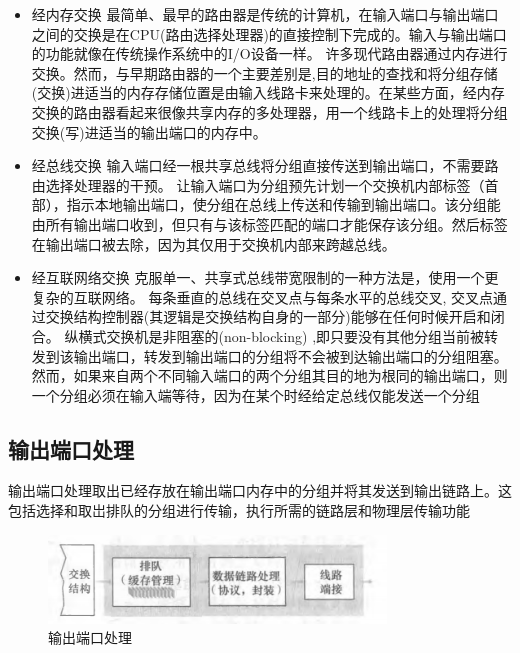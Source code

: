 \begin{itemize}
    \item 经内存交换
    \subitem 最简单、最早的路由器是传统的计算机，在输入端口与输出端口之间的交换是在CPU(路由选择处理器)的直接控制下完成的。输入与输出端口的功能就像在传统操作系统中的I/O设备一样。
    \subitem 许多现代路由器通过内存进行交换。然而，与早期路由器的一个主要差别是,目的地址的查找和将分组存储(交换)进适当的内存存储位置是由输入线路卡来处理的。在某些方面，经内存交换的路由器看起来很像共享内存的多处理器，用一个线路卡上的处理将分组交换(写)进适当的输出端口的内存中。
    \item 经总线交换
    \subitem 输入端口经一根共享总线将分组直接传送到输出端口，不需要路由选择处理器的干预。
    \subitem 让输入端口为分组预先计划一个交换机内部标签（首部），指示本地输出端口，使分组在总线上传送和传输到输出端口。该分组能由所有输出端口收到，但只有与该标签匹配的端口才能保存该分组。然后标签在输出端口被去除，因为其仅用于交换机内部来跨越总线。
    \item 经互联网络交换
    \subitem 克服单一、共享式总线带宽限制的一种方法是，使用一个更复杂的互联网络。
    \subitem 每条垂直的总线在交叉点与每条水平的总线交叉, 交叉点通过交换结构控制器(其逻辑是交换结构自身的一部分)能够在任何时候开启和闭合。
    \subitem 纵横式交换机是非阻塞的(non-blocking) ,即只要没有其他分组当前被转发到该输出端口，转发到输出端口的分组将不会被到达输出端口的分组阻塞。然而，如果来自两个不同输入端口的两个分组其目的地为根同的输出端口，则一个分组必须在输入端等待，因为在某个时经给定总线仅能发送一个分组
\end{itemize}

\subsection{输出端口处理}

    输出端口处理取出已经存放在输出端口内存中的分组并将其发送到输出链路上。这包括选择和取岀排队的分组进行传输，执行所需的链路层和物理层传输功能

\begin{figure}[!htbp]
    \centering
    \includegraphics[width=0.8\textwidth]{image/chapter04/输出端口处理.png}
    \caption{输出端口处理}
\end{figure}

